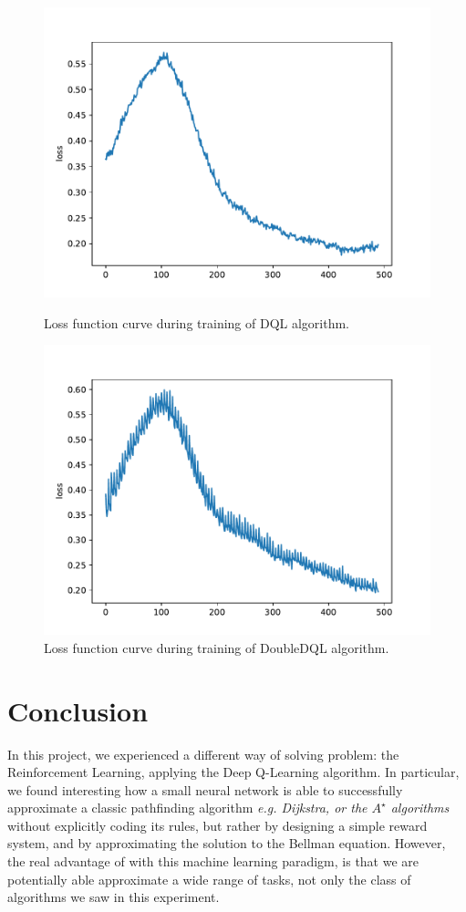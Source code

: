\documentclass{article}
\begin{document}
\begin{figure}
	\includegraphics[width=\textwidth]{loss_per_epoch_gdim-16_gamma-0.85_nepisodes-500_explorationstop-0.25_b-32_dql-False}
	\caption{Loss function curve during training of DQL algorithm.}
	\label{fig:dqlloss}
	
	\includegraphics[width=\textwidth]{loss_per_epoch_gdim-16_gamma-0.85_nepisodes-500_explorationstop-0.25_b-32_dql-True}
	\caption{Loss function curve during training of DoubleDQL algorithm.}
	\label{fig:doubledqlloss}
\end{figure}


\section{Conclusion}
In this project, we experienced a different way of solving problem: the Reinforcement Learning, applying the Deep Q-Learning algorithm. In particular, we found interesting how a small neural network is able to successfully approximate a classic pathfinding algorithm \textit{e.g. Dijkstra, or the $A^\star$ algorithms} without explicitly coding its rules, but rather by designing a simple reward system, and by approximating the solution to the Bellman equation. However, the real advantage of with this machine learning paradigm, is that we are potentially able approximate a wide range of tasks, not only the class of algorithms we saw in this experiment. 



\end{document}
